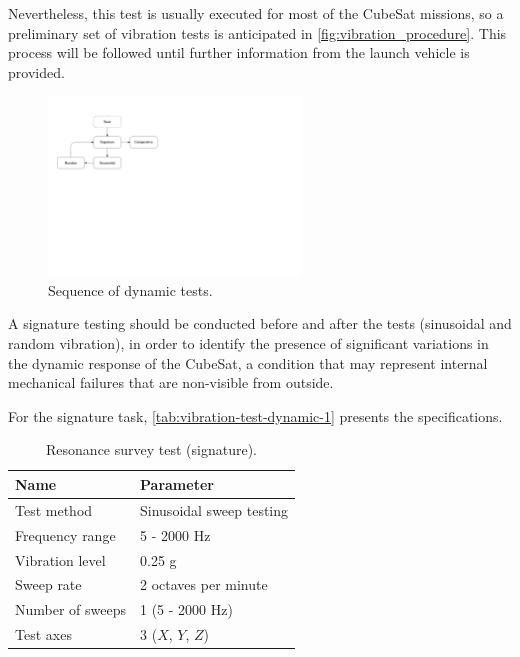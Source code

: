 Nevertheless, this test is usually executed for most of the CubeSat missions, so a preliminary set of vibration tests is anticipated in \autoref{fig:vibration_procedure}. This process will be followed until further information from the launch vehicle is provided.

\begin{figure}[!htb]
    \begin{center}
        \includegraphics[width=0.6\textwidth]{figures/vibration_procedure.pdf}
        \caption{Sequence of dynamic tests.}
        \label{fig:vibration_procedure}
    \end{center}
\end{figure}

A signature testing should be conducted before and after the tests (sinusoidal and random vibration), in order to identify the presence of significant variations in the dynamic response of the CubeSat, a condition that may represent internal mechanical failures that are non-visible from outside.

For the signature task, \autoref{tab:vibration-test-dynamic-1} presents the specifications.

\begin{table}[!htb]
    \begin{center}
        \begin{tabular}{ll}
            \toprule[1.5pt]
            \textbf{Name}    & \textbf{Parameter}       \\
            \midrule
            Test method      & Sinusoidal sweep testing \\
            Frequency range  & 5 - 2000 Hz              \\
            Vibration level  & 0.25 g                   \\
            Sweep rate       & 2 octaves per minute     \\
            Number of sweeps & 1 (5 - 2000 Hz)          \\
            Test axes        & 3 ($X$, $Y$, $Z$)        \\
            \bottomrule[1.5pt]
        \end{tabular}
        \caption{Resonance survey test (signature).}
        \label{tab:vibration-test-dynamic-1}
    \end{center}
\end{table}


